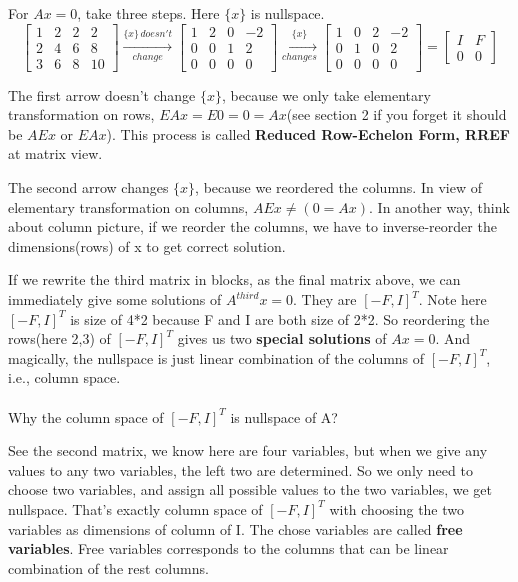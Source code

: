 \documentclass{article}
\begin{document}
\begin{spacing}{1.5}
For $Ax=0$, take three steps. Here $\{x\}$ is nullspace.
$$
\begin{bmatrix}
1 & 2 & 2 & 2 \\
2 & 4 & 6 & 8 \\ 
3 & 6 & 8 & 10 
\end{bmatrix}
\xrightarrow[change]{\{x\}\, doesn't}
\begin{bmatrix}
1 & 2 & 0 & -2 \\
0 & 0 & 1 & 2 \\ 
0 & 0 & 0 & 0
\end{bmatrix}
\xrightarrow[changes]{\{x\}}
\begin{bmatrix}
1 & 0 & 2 & -2 \\
0 & 1 & 0 & 2 \\ 
0 & 0 & 0 & 0
\end{bmatrix}
=
\begin{bmatrix}
	I & F \\
	0 & 0
\end{bmatrix}
$$

The first arrow doesn't change $\{x\}$, because we only take elementary transformation on rows, $EAx=E0=0=Ax$(see section 2 if you forget it should be $AEx$ or $EAx$). This process is called {\bfseries Reduced Row-Echelon Form, RREF} at matrix view.

The second arrow changes $\{x\}$, because we reordered the columns. In view of elementary transformation on columns, $AEx \neq (0=Ax)$. In another way, think about column picture, if we reorder the columns, we have to inverse-reorder the dimensions(rows) of x to get correct solution.

If we rewrite the third matrix in blocks, as the final matrix above, we can immediately give some solutions of $A^{third}x=0$. They are $[-F, I]^T$. Note here $[-F, I]^T$ is size of 4*2 because F and I are both size of 2*2. So reordering the rows(here 2,3) of $[-F, I]^T$ gives us two {\bfseries special solutions} of $Ax=0$. And magically, the nullspace is just linear combination of the columns of $[-F, I]^T$, i.e., column space. 
\\\\Why the column space of $[-F, I]^T$ is nullspace of A?

See the second matrix, we know here are four variables, but when we give any values to any two variables, the left two are determined. So we only need to choose two variables, and assign all possible values to the two variables, we get nullspace. That's exactly column space of $[-F, I]^T$ with choosing the two variables as dimensions of column of I. The chose variables are called {\bfseries free variables}. Free variables corresponds to the columns that can be linear combination of the rest columns.



\end{spacing}
\end{document}
